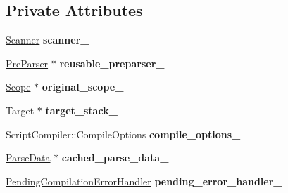 \subsection*{Private Attributes}
\begin{DoxyCompactItemize}
\item 
\hyperlink{classv8_1_1internal_1_1_scanner}{Scanner} {\bfseries scanner\+\_\+}\hypertarget{classv8_1_1internal_1_1_parser_ad2927729ab00c8b294cba49319615ac8}{}\label{classv8_1_1internal_1_1_parser_ad2927729ab00c8b294cba49319615ac8}

\item 
\hyperlink{classv8_1_1internal_1_1_pre_parser}{Pre\+Parser} $\ast$ {\bfseries reusable\+\_\+preparser\+\_\+}\hypertarget{classv8_1_1internal_1_1_parser_af9329ddefe7c1d3bc5e04f11b6f087d0}{}\label{classv8_1_1internal_1_1_parser_af9329ddefe7c1d3bc5e04f11b6f087d0}

\item 
\hyperlink{classv8_1_1internal_1_1_scope}{Scope} $\ast$ {\bfseries original\+\_\+scope\+\_\+}\hypertarget{classv8_1_1internal_1_1_parser_ad2df855bfe5c091e657632843126b0e9}{}\label{classv8_1_1internal_1_1_parser_ad2df855bfe5c091e657632843126b0e9}

\item 
Target $\ast$ {\bfseries target\+\_\+stack\+\_\+}\hypertarget{classv8_1_1internal_1_1_parser_a65844500a32ca2fe17918747c80cd8dd}{}\label{classv8_1_1internal_1_1_parser_a65844500a32ca2fe17918747c80cd8dd}

\item 
Script\+Compiler\+::\+Compile\+Options {\bfseries compile\+\_\+options\+\_\+}\hypertarget{classv8_1_1internal_1_1_parser_a6b7dea6afee5825560ba0d528aa0c4ab}{}\label{classv8_1_1internal_1_1_parser_a6b7dea6afee5825560ba0d528aa0c4ab}

\item 
\hyperlink{classv8_1_1internal_1_1_parse_data}{Parse\+Data} $\ast$ {\bfseries cached\+\_\+parse\+\_\+data\+\_\+}\hypertarget{classv8_1_1internal_1_1_parser_abe39e460f7d9b0cc88ac6ee054be50cc}{}\label{classv8_1_1internal_1_1_parser_abe39e460f7d9b0cc88ac6ee054be50cc}

\item 
\hyperlink{classv8_1_1internal_1_1_pending_compilation_error_handler}{Pending\+Compilation\+Error\+Handler} {\bfseries pending\+\_\+error\+\_\+handler\+\_\+}\hypertarget{classv8_1_1internal_1_1_parser_a9e25b7f6067e8f131aa7f0b62d690957}{}\label{classv8_1_1internal_1_1_parser_a9e25b7f6067e8f131aa7f0b62d690957}


\end{DoxyCompactItemize}
